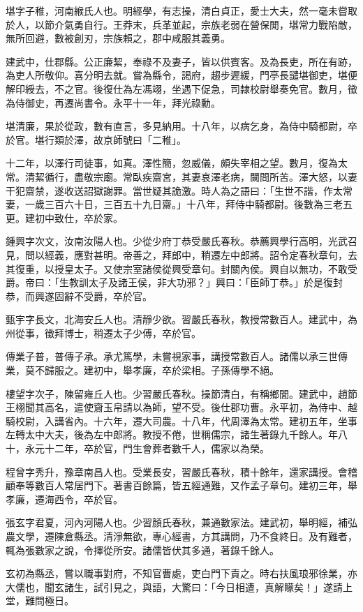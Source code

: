\begin{pinyinscope}
堪字子稚，河南緱氏人也。明經學，有志操，清白貞正，愛士大夫，然一毫未嘗取於人，以節介氣勇自行。王莽末，兵革並起，宗族老弱在營保閒，堪常力戰陷敵，無所回避，數被創刃，宗族賴之，郡中咸服其義勇。

建武中，仕郡縣。公正廉絜，奉祿不及妻子，皆以供賓客。及為長吏，所在有跡，為吏人所敬仰。喜分明去就。嘗為縣令，謁府，趨步遲緩，門亭長譴堪御吏，堪便解印綬去，不之官。後復仕為左馮翊，坐遇下促急，司隸校尉舉奏免官。數月，徵為侍御史，再遷尚書令。永平十一年，拜光祿勳。

堪清廉，果於從政，數有直言，多見納用。十八年，以病乞身，為侍中騎都尉，卒於官。堪行類於澤，故京師號曰「二稚」。

十二年，以澤行司徒事，如真。澤性簡，忽威儀，頗失宰相之望。數月，復為太常。清絜循行，盡敬宗廟。常臥疾齋宮，其妻哀澤老病，闚問所苦。澤大怒，以妻干犯齋禁，遂收送詔獄謝罪。當世疑其詭激。時人為之語曰：「生世不諧，作太常妻，一歲三百六十日，三百五十九日齋。」十八年，拜侍中騎都尉。後數為三老五更。建初中致仕，卒於家。

鍾興字次文，汝南汝陽人也。少從少府丁恭受嚴氏春秋。恭薦興學行高明，光武召見，問以經義，應對甚明。帝善之，拜郎中，稍遷左中郎將。詔令定春秋章句，去其復重，以授皇太子。又使宗室諸侯從興受章句。封關內侯。興自以無功，不敢受爵。帝曰：「生教訓太子及諸王侯，非大功邪？」興曰：「臣師丁恭。」於是復封恭，而興遂固辭不受爵，卒於官。

甄宇字長文，北海安丘人也。清靜少欲。習嚴氏春秋，教授常數百人。建武中，為州從事，徵拜博士，稍遷太子少傅，卒於官。

傳業子普，普傳子承。承尤篤學，未嘗視家事，講授常數百人。諸儒以承三世傳業，莫不歸服之。建初中，舉孝廉，卒於梁相。子孫傳學不絕。

樓望字次子，陳留雍丘人也。少習嚴氏春秋。操節清白，有稱鄉閭。建武中，趙節王栩聞其高名，遣使齎玉帛請以為師，望不受。後仕郡功曹。永平初，為侍中、越騎校尉，入講省內。十六年，遷大司農。十八年，代周澤為太常。建初五年，坐事左轉太中大夫，後為左中郎將。教授不倦，世稱儒宗，諸生著錄九千餘人。年八十，永元十二年，卒於官，門生會葬者數千人，儒家以為榮。

程曾字秀升，豫章南昌人也。受業長安，習嚴氏春秋，積十餘年，還家講授。會稽顧奉等數百人常居門下。著書百餘篇，皆五經通難，又作孟子章句。建初三年，舉孝廉，遷海西令，卒於官。

張玄字君夏，河內河陽人也。少習顏氏春秋，兼通數家法。建武初，舉明經，補弘農文學，遷陳倉縣丞。清淨無欲，專心經書，方其講問，乃不食終日。及有難者，輒為張數家之說，令擇從所安。諸儒皆伏其多通，著錄千餘人。

玄初為縣丞，嘗以職事對府，不知官曹處，吏白門下責之。時右扶風琅邪徐業，亦大儒也，聞玄諸生，試引見之，與語，大驚曰：「今日相遭，真解矇矣！」遂請上堂，難問極日。


\end{pinyinscope}
